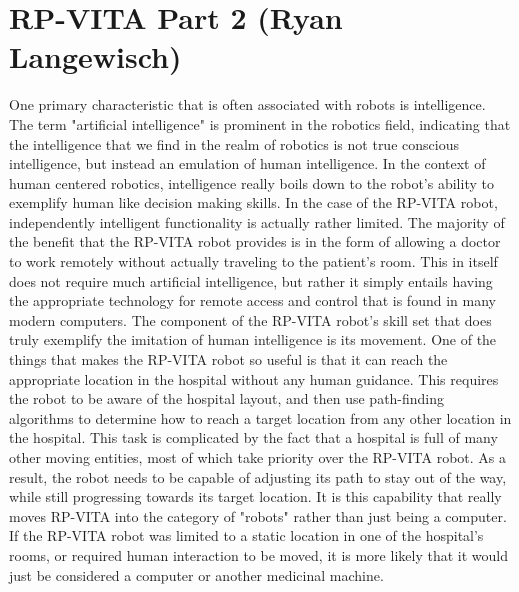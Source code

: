 \documentclass[11pt,conference]{IEEEtran}
\begin{document}
\section{RP-VITA Part 2 (Ryan Langewisch)}
One primary characteristic that is often associated with robots is intelligence. The term "artificial intelligence" is prominent in the robotics field, indicating that the intelligence that we find in the realm of robotics is not true conscious intelligence, but instead an emulation of human intelligence. In the context of human centered robotics, intelligence really boils down to the robot's ability to exemplify human like decision making skills. In the case of the RP-VITA robot, independently intelligent functionality is actually rather limited. 
\newline
\indent The majority of the benefit that the RP-VITA robot provides is in the form of allowing a doctor to work remotely without actually traveling to the patient's room. This in itself does not require much artificial intelligence, but rather it simply entails having the appropriate technology for remote access and control that is found in many modern computers. The component of the RP-VITA robot's skill set that does truly exemplify the imitation of human intelligence is its movement. One of the things that makes the RP-VITA robot so useful is that it can reach the appropriate location in the hospital without any human guidance. This requires the robot to be aware of the hospital layout, and then use path-finding algorithms to determine how to reach a target location from any other location in the hospital. This task is complicated by the fact that a hospital is full of many other moving entities, most of which take priority over the RP-VITA robot. As a result, the robot needs to be capable of adjusting its path to stay out of the way, while still progressing towards its target location. It is this capability that really moves RP-VITA into the category of "robots" rather than just being a computer. If the RP-VITA robot was limited to a static location in one of the hospital's rooms, or required human interaction to be moved, it is more likely that it would just be considered a computer or another medicinal machine.
\newline
\end{document}
